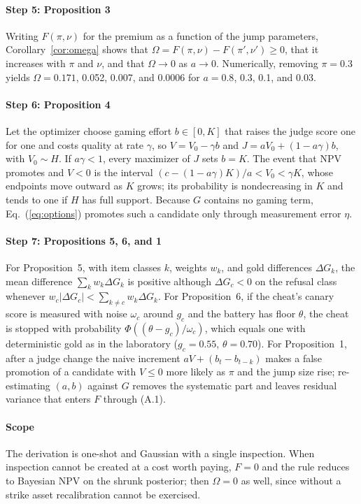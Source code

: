 \documentclass[acmsmall,screen,review]{acmart}
\theoremstyle{acmdefinition}
\begin{document}
\paragraph{Step 5: Proposition 3} Writing $F(\pi,\nu)$ for the premium as a function of the jump parameters, Corollary~\ref{cor:omega} shows that $\Omega = F(\pi,\nu) - F(\pi',\nu') \ge 0$, that it increases with $\pi$ and $\nu$, and that $\Omega \to 0$ as $a \to 0$. Numerically, removing $\pi = 0.3$ yields $\Omega = 0.171$, 0.052, 0.007, and 0.0006 for $a = 0.8$, 0.3, 0.1, and 0.03.

\paragraph{Step 6: Proposition 4} Let the optimizer choose gaming effort $b \in [0,K]$ that raises the judge score one for one and costs quality at rate $\gamma$, so $V = V_0 - \gamma b$ and $J = aV_0 + (1 - a\gamma)b$, with $V_0 \sim H$. If $a\gamma < 1$, every maximizer of $J$ sets $b = K$. The event that NPV promotes and $V < 0$ is the interval $(c - (1-a\gamma)K)/a < V_0 < \gamma K$, whose endpoints move outward as $K$ grows; its probability is nondecreasing in $K$ and tends to one if $H$ has full support. Because $G$ contains no gaming term, Eq.~(\ref{eq:options}) promotes such a candidate only through measurement error $\eta$.

\paragraph{Step 7: Propositions 5, 6, and 1} For Proposition~5, with item classes $k$, weights $w_k$, and gold differences $\Delta G_k$, the mean difference $\sum_k w_k\Delta G_k$ is positive although $\Delta G_c < 0$ on the refusal class whenever $w_c|\Delta G_c| < \sum_{k\ne c} w_k\Delta G_k$. For Proposition~6, if the cheat's canary score is measured with noise $\omega_c$ around $g_c$ and the battery has floor $\theta$, the cheat is stopped with probability $\Phi((\theta - g_c)/\omega_c)$, which equals one with deterministic gold as in the laboratory ($g_c = 0.55$, $\theta = 0.70$). For Proposition~1, after a judge change the naive increment $aV + (b_t - b_{t-k})$ makes a false promotion of a candidate with $V \le 0$ more likely as $\pi$ and the jump size rise; re-estimating $(a,b)$ against $G$ removes the systematic part and leaves residual variance that enters $F$ through (A.1).

\paragraph{Scope} The derivation is one-shot and Gaussian with a single inspection. When inspection cannot be created at a cost worth paying, $F = 0$ and the rule reduces to Bayesian NPV on the shrunk posterior; then $\Omega = 0$ as well, since without a strike asset recalibration cannot be exercised.
\end{document}
